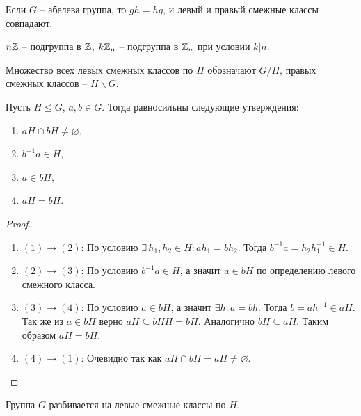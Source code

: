 \begin{note}
    Если $G$ -- абелева группа, то $gh = hg$, и левый и правый смежные классы совпадают.
\end{note}

\begin{proposition}
    $n\mathbb{Z}$ -- подгруппа в $\mathbb{Z}$, $k\mathbb{Z}_n$ -- подгруппа в $\mathbb{Z}_n$ при условии $k|n$.
\end{proposition}

\begin{definition}
    Множество всех левых смежных классов по $H$ обозначают $G / H$, правых смежных классов -- $H \backslash G$.
\end{definition}

\begin{proposition}
    \label{pr1.1}
    Пусть $H \leq G$, $a, b \in G$. Тогда равносильны следующие утверждения:
    \begin{enumerate}
        \item $aH \cap bH \neq \varnothing$,
        \item $b^{-1}a \in H$,
        \item $a \in bH$,
        \item $aH = bH$.
    \end{enumerate}
\end{proposition}

\begin{proof}~
    \begin{enumerate}
        \item $(1) \to (2)$: По условию $\exists\, h_1, h_2 \in H: ah_1 = bh_2$. Тогда $b^{-1}a = h_2 h_1^{-1} \in H$.
        \item $(2) \to (3)$: По условию $b^{-1}a \in H$, а значит $a \in bH$ по определению левого смежного класса.
        \item $(3) \to (4)$: По условию $a \in bH$, а значит $\exists h: a = bh$. Тогда $b = ah^{-1} \in aH$. Так же из 
        $a \in bH$ верно $aH \subseteq bHH = bH$. Аналогично $bH \subseteq aH$.
        Таким образом $aH = bH$.
        \item $(4) \to (1)$: Очевидно так как $aH \cap bH = aH \neq \varnothing$.
    \end{enumerate}
\end{proof}

\begin{corollary}
    Группа $G$ разбивается на левые смежные классы по $H$.
\end{corollary}

